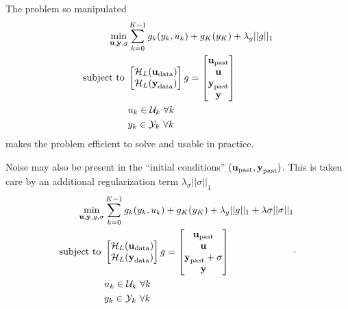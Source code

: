 The problem so manipulated
\begin{equation*}
  \begin{aligned}
    \min_{\boldsymbol{\mathrm{u}},\boldsymbol{\mathrm{y}},g} & \sum_{k=0}^{K-1} g_k(y_k,u_k) + g_K(y_K) + \lambda_g||g||_1 \\
    \textrm{subject to } &  \begin{bmatrix}
                              \mathcal{H}_L(\boldsymbol{\mathrm{u}}_\textrm{data}) \\
                              \mathcal{H}_L(\boldsymbol{\mathrm{y}}_\textrm{data})
                            \end{bmatrix}g =
                           \begin{bmatrix}
                             \boldsymbol{\mathrm{u}}_\textrm{past} \\ \boldsymbol{\mathrm{u}} \\ \boldsymbol{\mathrm{y}}_\textrm{past} \\ \boldsymbol{\mathrm{y}}
                           \end{bmatrix} \\
                       & u_k \in \mathcal{U}_k\ \forall k \\
                       & y_k \in \mathcal{Y}_k\ \forall k
  \end{aligned}
\end{equation*}
makes the problem efficient to solve and usable in practice.

Noise may also be present in the ``initial conditions'' $(\boldsymbol{\mathrm{u}}_\textrm{past},\boldsymbol{\mathrm{y}}_\textrm{past})$. This is taken care by an additional regularization term $\lambda_\sigma ||\sigma||_1$
\begin{equation*}
  \begin{aligned}
    \min_{\boldsymbol{\mathrm{u}},\boldsymbol{\mathrm{y}},g,\sigma} & \sum_{k=0}^{K-1} g_k(y_k,u_k) + g_K(y_K) + \lambda_g||g||_1 + \lambda\sigma ||\sigma||_1\\
    \textrm{subject to } &  \begin{bmatrix}
                              \mathcal{H}_L(\boldsymbol{\mathrm{u}}_\textrm{data}) \\
                              \mathcal{H}_L(\boldsymbol{\mathrm{y}}_\textrm{data})
                            \end{bmatrix}g =
                           \begin{bmatrix}
                             \boldsymbol{\mathrm{u}}_\textrm{past} \\ \boldsymbol{\mathrm{u}} \\ \boldsymbol{\mathrm{y}}_\textrm{past}+\sigma \\ \boldsymbol{\mathrm{y}}
                           \end{bmatrix} \\
                       & u_k \in \mathcal{U}_k\ \forall k \\
                       & y_k \in \mathcal{Y}_k\ \forall k
  \end{aligned}.
\end{equation*}


